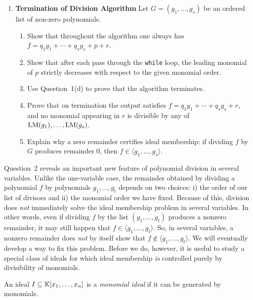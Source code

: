 \documentclass[12pt,reqno]{amsart}
\begin{document}
\begin{enumerate}[leftmargin=*]
\item \textbf{Termination of Division Algorithm} Let $G=(g_1,\ldots,g_s)$ be an ordered list of non-zero polynomials.
\begin{enumerate}[label=(\alph*),ref=\theenumi\alph*]
    \item Show that throughout the algorithm one always has $f=q_1g_1+\cdots+q_sg_s+p+r$.
    
    \item Show that after each pass through the \texttt{while} loop, the leading monomial of $p$ strictly decreases with respect to the given monomial order.
    
    \item Use Question~1(d) to prove that the algorithm terminates.
    
    \item Prove that on termination the output satisfies $f=q_1g_1+\cdots+q_sg_s+r$, and no monomial appearing in $r$ is divisible by any of $\operatorname{LM}(g_1),\ldots,\operatorname{LM}(g_s)$.
    
    \item Explain why a zero remainder certifies ideal membership: if dividing $f$ by $G$ produces remainder $0$, then $f\in \langle g_1,\ldots,g_s\rangle$.
\end{enumerate}
\end{enumerate}

\hrulefill

Question~2 reveals an important new feature of polynomial division in several variables. Unlike the one-variable case, the remainder obtained by dividing a polynomial \(f\) by polynomials \(g_1,\dots,g_t\) depends on two choices: i) the order of our list of divisors and ii) the monomial order we have fixed. Because of this, division does \emph{not} immediately solve the ideal membership problem in several variables. In other words, even if dividing $f$ by the list $(g_1,\dots,g_t)$ produces a nonzero remainder, it may still happen that $f\in \langle g_1,\dots,g_t\rangle$.  So, in several variables, a nonzero remainder does \emph{not} by itself show that $f \notin \langle g_1,\dots,g_t\rangle$. We will eventually develop a way to fix this problem. Before we do, however, it is useful to study a special class of ideals for which ideal membership \emph{is} controlled purely by divisibility of monomials.

\begin{definition}
An ideal $I\subseteq \mathbb{K}[x_1,\ldots,x_n]$ is a \emph{monomial ideal} if it can be generated by monomials.
\end{definition}
\end{document}
